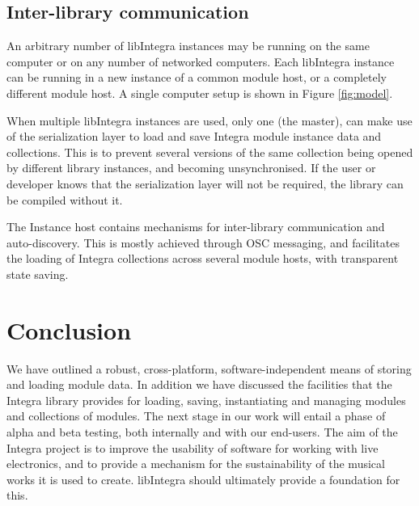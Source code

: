 \subsection{Inter-library communication}\label{subsec:interlib}

An arbitrary number of libIntegra instances may be running on the same computer or on any number of networked computers. Each libIntegra instance can be running in a new instance of a common module host, or a completely different module host. A single computer
setup is shown in Figure \ref{fig:model}. 

When multiple libIntegra instances are used, only one (the master), can make use of the serialization layer to load and save Integra module instance data and collections. This is to prevent several versions of the same collection being opened by different library instances, and becoming unsynchronised. If the user or developer knows that the serialization layer will not be required, the library can be compiled without it.

The Instance host contains mechanisms for inter-library communication and auto-discovery. This is mostly achieved through OSC messaging, and facilitates the loading of Integra collections across several module hosts, with transparent state saving.


\section{Conclusion}\label{sec:conclusion}

We have outlined a robust, cross-platform, software-in\-dependent means of storing and loading module data. In addition we have discussed the facilities that the Integra library provides for loading, saving, instantiating and managing modules and collections of modules. The next stage in our work will entail a phase of alpha and beta testing, both internally and with our end-users. The aim of the Integra project is to improve the usability of software for working with live electronics, and to provide a mechanism for the sustainability of the musical works it is used to create. libIntegra should ultimately provide a foundation for this.

